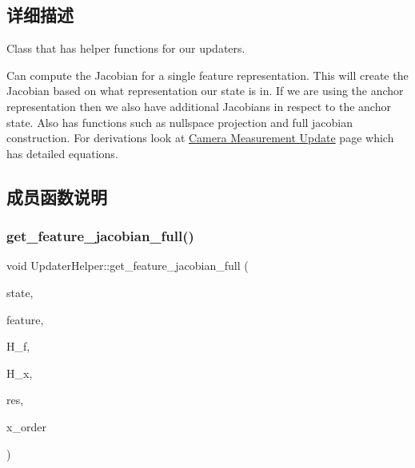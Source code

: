 \subsection{详细描述}
Class that has helper functions for our updaters. 

Can compute the Jacobian for a single feature representation. This will create the Jacobian based on what representation our state is in. If we are using the anchor representation then we also have additional Jacobians in respect to the anchor state. Also has functions such as nullspace projection and full jacobian construction. For derivations look at \hyperlink{update-feat}{Camera Measurement Update} page which has detailed equations. 

\subsection{成员函数说明}
\mbox{\label{classov__msckf_1_1UpdaterHelper_a83ba71455395ed13bbd15eb9134a6075}} 
\subsubsection{\texorpdfstring{get\+\_\+feature\+\_\+jacobian\+\_\+full()}{get\_feature\_jacobian\_full()}}
{\footnotesize\ttfamily void Updater\+Helper\+::get\+\_\+feature\+\_\+jacobian\+\_\+full (\begin{DoxyParamCaption}\item[{std\+::shared\+\_\+ptr$<$ \hyperlink{classov__msckf_1_1State}{State} $>$}]{state,  }\item[{\hyperlink{structov__msckf_1_1UpdaterHelper_1_1UpdaterHelperFeature}{Updater\+Helper\+Feature} \&}]{feature,  }\item[{Eigen\+::\+Matrix\+Xd \&}]{H\+\_\+f,  }\item[{Eigen\+::\+Matrix\+Xd \&}]{H\+\_\+x,  }\item[{Eigen\+::\+Vector\+Xd \&}]{res,  }\item[{std\+::vector$<$ std\+::shared\+\_\+ptr$<$ \hyperlink{classov__type_1_1Type}{ov\+\_\+type\+::\+Type} $>$$>$ \&}]{x\+\_\+order }\end{DoxyParamCaption})\hspace{0.3cm}{\ttfamily [static]}}



